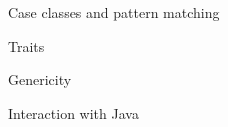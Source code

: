 \documentclass[10pt,a4paper]{book}
\begin{document}
\begin{chapter}{Case classes and pattern matching}

\end{chapter}

\begin{chapter}{Traits}

\end{chapter}

\begin{chapter}{Genericity}

\end{chapter}

\begin{chapter}{Interaction with Java}

\end{chapter}
\end{document}
